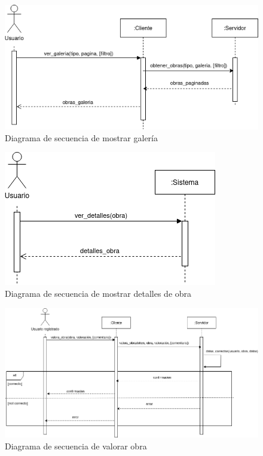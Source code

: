 \begin{figure}[h]
    \centering
    \includegraphics[width=\textwidth]{diagramas/secuencia_mostrar_galeria.png}
    \caption{Diagrama de secuencia de mostrar galería}
    \label{fig:mostrar_galeria}
\end{figure}

\begin{figure}[h]
    \centering
    \includegraphics[width=\textwidth]{diagramas/secuencia_mostrar_detalles_obra.png}
    \caption{Diagrama de secuencia de mostrar detalles de obra}
    \label{fig:mostrar_detalles_obra}
\end{figure}

\begin{figure}[h]
    \centering
    \includegraphics[width=\textwidth]{diagramas/secuencia_valorar_obra.png}
    \caption{Diagrama de secuencia de valorar obra}
    \label{fig:valorar_obra}
\end{figure}
